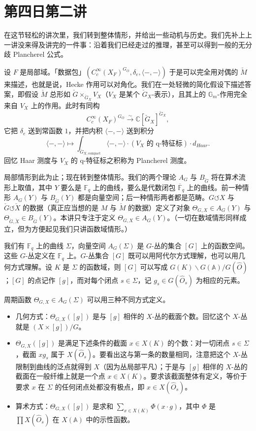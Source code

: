 \section{第四日第二讲}

在这节轻松的讲次里，我们转到整体情形，并给出一些动机与历史。我们先补上上一讲没来得及讲完的一件事：沿着我们已经走过的推理，甚至可以得到一般的无分歧 Plancherel 公式。

设 $F$ 是局部域。「数据包」$(C_c^\infty(X_F)^{G_O},\delta_e,\langle-,-\rangle)$ 于是可以完全用对偶的 $\check M$ 来描述，也就是说，Hecke 作用可以对角化。我们在一处轻微的简化假设下描述答案，即假设 $\check M$ 总形如 $\check G\times_{\check G_X}V_X$（$V_X$ 是某个 $\check G_X$-表示），且其上的 $\mathbb G_m$-作用完全来自 $V_X$ 上的作用。此时有同构
\[
  C_c^\infty(X_F)^{G_O}\overset{\sim}{\longrightarrow}\mathbb C[\check G_X]^{\check G_X},
\]
它把 $\delta_e$ 送到常函数 $1$，并把内积 $\langle-,-\rangle$ 送到积分
\[
  \langle-,-\rangle\mapsto\int_{\check G_{X,\mathrm{compact}}}\langle-,-\rangle\cdot(\text{$V_X$ 的 q-特征标})\cdot d_{Haar}.
\]
回忆 Haar 测度与 $V_X$ 的 q-特征标之积称为 Plancherel 测度。

局部情形到此为止；现在转到整体情形。我们的两个理论 $A_G$ 与 $B_{\check G}$ 将在算术流形上取值，其中 $Y$ 要么是 $\mathbb F_q$ 上的曲线，要么是代数闭包 $\overline{\mathbb F}_q$ 上的曲线。前一种情形 $A_G(Y)$ 与 $B_{\check G}(Y)$ 都是向量空间；后一种情形两者都是范畴。$G\circlearrowleft X$ 与 $\check G\circlearrowleft\check X$ 的数据（真正应当想的是 $M$ 与 $\check M$ 的数据）定义了对象 $\Theta_{G,X}\in A_G(Y)$ 与 $\Theta_{\check G,\check X}\in B_{\check G}(Y)$。本讲只专注于定义 $\Theta_{G,X}\in A_G(Y)$。（一切在数域情形同样成立，但为方便起见我们只讲函数域情形。）

我们有 $\mathbb F_q$ 上的曲线 $\Sigma$，向量空间 $A_G(\Sigma)$ 是 $G$-丛的集合 $[G]$ 上的函数空间。这些 $G$-丛定义在 $\mathbb F_q$ 上。$G$-丛集合 $[G]$ 既可以用阿代尔方式理解，也可以用几何方式理解。设 $K$ 是 $\Sigma$ 的函数域，则 $[G]$ 可以写成 $G(K)\backslash G(\mathbb A)/G(\hat O)$；$[G]$ 的点记作 $[g]$，而对每个闭点 $s\in\Sigma$，记 $g_s\in G(\hat O_s)$ 为相应的元素。

周期函数 $\Theta_{G,X}\in A_G(\Sigma)$ 可以用三种不同方式定义。

\begin{itemize}[leftmargin=1.6em]
  \item 几何方式：$\Theta_{G,X}([g])$ 是与 $[g]$ 相伴的 $X$-丛的截面个数。回忆这个 $X$-丛就是 $(X\times[g])/G$。
  \item $\Theta_{G,X}([g])$ 是满足下述条件的截面 $x\in X(K)$ 的个数：对一切闭点 $s\in\Sigma$，截面 $xg_s$ 属于 $X(\hat O_s)$。要看出这与第一条的数量相同，注意把这个 $X$-丛限制到曲线的泛点就得到 $X$（因为丛局部平凡）；于是与 $[g]$ 相伴的 $X$-丛的截面在一般纤维上就是一个点 $x\in X(K)$。要求该截面整体有定义，等价于要求 $x$ 在 $\Sigma$ 的任何闭点处都没有极点，即 $x\in X(\hat O_s)$。
  \item 算术方式：$\Theta_{G,X}([g])$ 是求和 $\sum_{x\in X(K)}\Phi(x\cdot g)$，其中 $\Phi$ 是 $\prod X(\hat O_s)$ 在 $X(\mathbb A)$ 中的示性函数。
\end{itemize}

